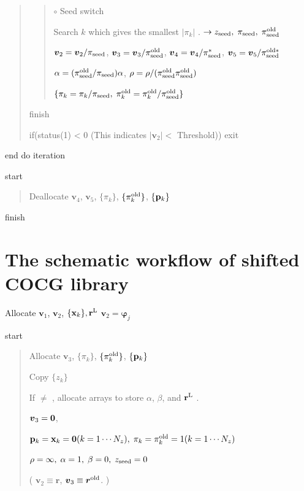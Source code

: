 \documentclass[letterpaper,10pt,dvipdfmx,openany]{sphinxmanual}
\begin{document}
\begin{quote}
\begin{quote}
\(\circ\) Seed switch

Search \(k\) which gives the smallest \(|\pi_k|\) .
\(\rightarrow z_{\rm seed},\; \pi_{\rm seed},\; \pi_{\rm seed}^{\rm old}\)

\({\boldsymbol v}_2 = {\boldsymbol v}_2 / \pi_{\rm seed}\),
\({\boldsymbol v}_3 = {\boldsymbol v}_3 / \pi_{\rm seed}^{\rm old}\),
\({\boldsymbol v}_4 = {\boldsymbol v}_4 / \pi_{\rm seed}^{*}\),
\({\boldsymbol v}_5 = {\boldsymbol v}_5 / \pi_{\rm seed}^{\rm old *}\)

\(\alpha = (\pi_{\rm seed}^{\rm old} / \pi_{\rm seed}) \alpha\),
\(\rho = \rho / (\pi_{\rm seed}^{\rm old} \pi_{\rm seed}^{\rm old})\)

\(\{\pi_k = \pi_k / \pi_{\rm seed},\; \pi_k^{\rm old} = \pi_k^{\rm old} / \pi_{\rm seed}^{\rm old}\}\)
\end{quote}

 finish

if(status(1) \textless{} 0 (This indicates \(|{\boldsymbol v}_2| <\) Threshold)) exit
\end{quote}

end do iteration

 start
\begin{quote}

Deallocate \({\boldsymbol v}_4\), \({\boldsymbol v}_5\),
\(\{\pi_k\}\), \(\{\pi_k^{\rm old}\}\), \(\{{\bf p}_k\}\)
\end{quote}

 finish


\section{The schematic workflow of shifted COCG library}
\label{komega_workflow_en:the-schematic-workflow-of-shifted-cocg-library}
Allocate \({\boldsymbol v}_1\), \({\boldsymbol v}_2\),
\(\{{\bf x}_k\}, {\bf r}^{\rm L}\)
\({\boldsymbol v}_2 = {\boldsymbol \varphi_j}\)

 start
\begin{quote}

Allocate \({\boldsymbol v}_3\), \(\{\pi_k\}\),
\(\{\pi_k^{\rm old}\}\), \(\{{\bf p}_k\}\)

Copy \(\{z_k\}\)

If  \(\neq\)  , allocate arrays
to store \(\alpha\), \(\beta\), and \({\bf r}^{\rm L}\) .

\({\boldsymbol v}_3 = {\bf 0}\),

\({\bf p}_{k} = {\bf x}_k = {\bf 0}(k=1 \cdots N_z),\; \pi_k=\pi_k^{\rm old} = 1(k=1 \cdots N_z)\)

\(\rho = \infty,\; \alpha = 1,\; \beta=0,\; z_{\rm seed}=0\)

( \({\boldsymbol v}_2 \equiv {\boldsymbol r}\),
\({\boldsymbol v}_3 \equiv {\boldsymbol r}^{\rm old}\). )
\end{quote}
\end{document}

